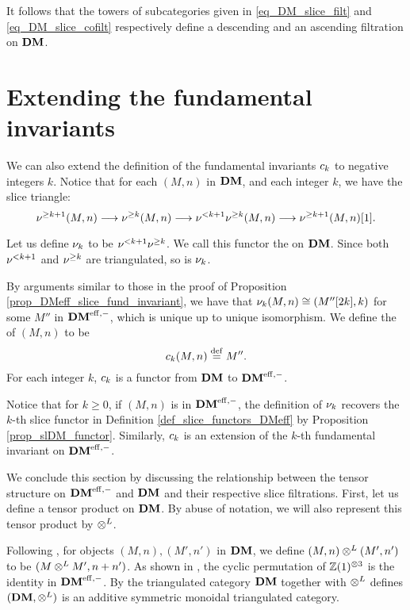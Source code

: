 It follows that the towers of subcategories given in 
\eqref{eq_DM_slice_filt} and \eqref{eq_DM_slice_cofilt} 
respectively define a descending and an ascending filtration on 
$\mathbf{DM}$.

\section{Extending the fundamental invariants}

We can also extend the definition of the fundamental invariants
$c_{k}$ to negative integers $k$. Notice that for each $(M, n)$
in $\mathbf{DM}$, and each integer $k$, we have the slice triangle:
\[
\nu^{\geq k + 1}(M, n) \longrightarrow \nu^{\geq k}(M, n) \longrightarrow \nu^{< k + 1}\nu^{\geq k}(M, n)
\longrightarrow \nu^{\geq k + 1}(M, n)[1].
\]

\begin{defn}
Let us define $\nu_{k}$ to be $\nu^{< k + 1}\nu^{\geq k}$. We call
this functor the  on $\mathbf{DM}$. Since both 
$\nu^{< k + 1}$ and $\nu^{\geq k}$ are triangulated, so is 
$\nu_{k}$.

By arguments similar to those in the proof of Proposition
\ref{prop_DMeff_slice_fund_invariant}, we have that 
$\nu_{k}(M, n) \cong (M''[2k], k)$ for some $M''$ in $\mathbf{DM}^{\mathrm{eff},-}$,
which is unique up to unique isomorphism. We 
define the  of $(M, n)$ to be
\[
c_{k}(M, n) \stackrel{\mathrm{def}}{=} M''.
\]
For each integer $k$, $c_{k}$ is a functor from $\mathbf{DM}$ to
$\mathbf{DM}^{\mathrm{eff},-}$.

Notice that for $k \geq 0$, if $(M, n)$ is in $\mathbf{DM}^{\mathrm{eff},-}$, the definition
of $\nu_{k}$ recovers the $k$-th slice functor in Definition
\ref{def_slice_functors_DMeff} by Proposition
\ref{prop_slDM_functor}. Similarly, $c_{k}$ is an extension of the
$k$-th fundamental invariant on $\mathbf{DM}^{\mathrm{eff},-}$.
\end{defn}

We conclude this section by discussing the relationship between the
tensor structure on $\mathbf{DM}^{\mathrm{eff},-}$ and $\mathbf{DM}$ and their respective slice
filtrations. First, let us define a tensor product on $\mathbf{DM}$. By 
abuse of notation, we will also represent this tensor product by 
$\otimes^L$.

\begin{defn}\label{def_tensor_DM}
Following \cite[8A]{MVW}, for objects $(M, n), (M', n')$ in $\mathbf{DM}$, we 
define $(M, n) \otimes^L (M', n')$ to be $(M \otimes^L M', n + n')$. As 
shown in \cite[15.8]{MVW}, the cyclic permutation of 
$\mathbb{Z}(1)^{\otimes 3}$ is the identity in $\mathbf{DM}^{\mathrm{eff},-}$. By 
\cite[8A.12]{MVW} the triangulated category $\mathbf{DM}$ together with 
$\otimes^L$ defines $(\mathbf{DM}, \otimes^L)$ is an additive symmetric monoidal 
triangulated category. 
\end{defn}

